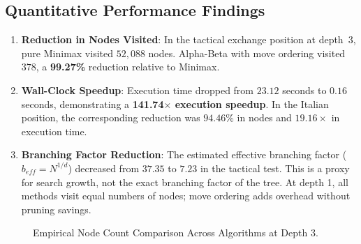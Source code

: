 \documentclass[11pt,a4paper]{article}
\begin{document}
\subsection{Quantitative Performance Findings}
\begin{enumerate}[leftmargin=*]
    \item \textbf{Reduction in Nodes Visited}: In the tactical exchange position at depth~3, pure Minimax visited $52,088$ nodes. Alpha-Beta with move ordering visited $378$, a \textbf{99.27\%} reduction relative to Minimax.
    \item \textbf{Wall-Clock Speedup}: Execution time dropped from $23.12$ seconds to $0.16$ seconds, demonstrating a \textbf{141.74$\times$ execution speedup}. In the Italian position, the corresponding reduction was $94.46\%$ in nodes and $19.16\times$ in execution time.
    \item \textbf{Branching Factor Reduction}: The estimated effective branching factor ($b_{eff}=N^{1/d}$) decreased from $37.35$ to $7.23$ in the tactical test. This is a proxy for search growth, not the exact branching factor of the tree. At depth 1, all methods visit equal numbers of nodes; move ordering adds overhead without pruning savings.
\end{enumerate}
\begin{figure}[H]
\centering
{}
\caption{Empirical Node Count Comparison Across Algorithms at Depth 3.}
\label{fig:nodes_chart}
\end{figure}
\end{document}
